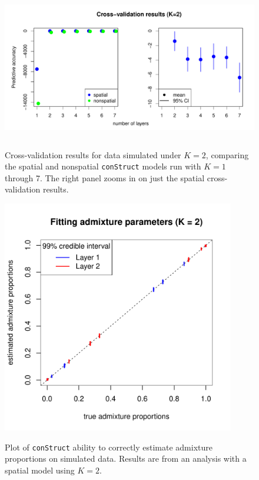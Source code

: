 \documentclass[10pt,letterpaper]{article}
\begin{document}
\begin{figure}
	\centering
		{\includegraphics[width=5in,height=2.5in]{figs/sims/simK2_std_xval.pdf}}
		\caption{
			Cross-validation results for data simulated under $K=2$,
			comparing the spatial and nonspatial \texttt{conStruct} models run with $K=1$ through 7.  
			The right panel zooms in on just the spatial cross-validation results.
		}\label{simK2_xval}
\end{figure}

\begin{figure}
	\centering
		{\includegraphics[width=4in,height=4in]{figs/sims/simK2_adprop_fit.pdf}}
		\caption{
			Plot of \texttt{conStruct} ability to correctly estimate admixture proportions on simulated data.
			Results are from an analysis with a spatial model using $K=2$.
		}\label{simK2_adprop_fit}
\end{figure}
\end{document}
